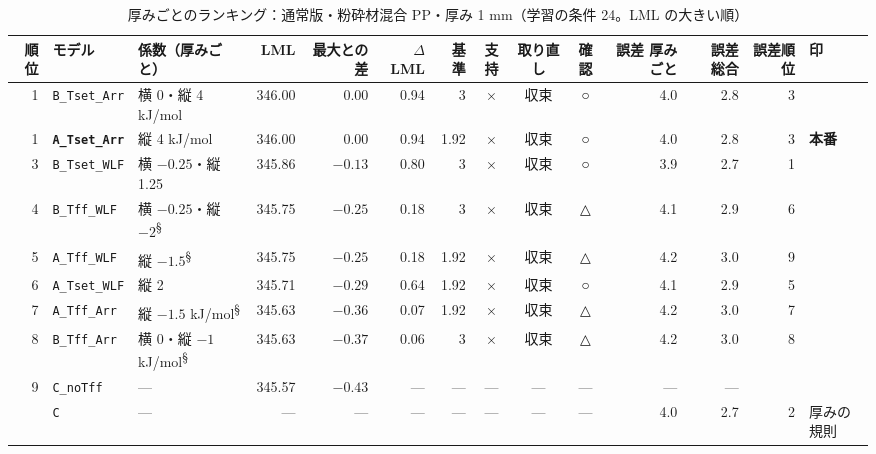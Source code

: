 \documentclass[paper=a4paper,landscape,fontsize=10pt,line_length=62zw,number_of_lines=34]{jlreq}
\let\origtextbf\textbf
\renewcommand{\textbf}[1]{\origtextbf{\gtfamily #1}}   %
\begin{document}
\begin{table}[H]\centering\footnotesize
\caption{厚みごとのランキング：通常版・粉砕材混合 PP・厚み 1 mm（学習の条件 24。LML の大きい順）}
\begin{tabular}{rlp{11\zw}rrrrccc rrrl}
\toprule
順位 & モデル & 係数（厚みごと） & LML & 最大との差 & $\Delta$LML & 基準 & 支持 & 取り直し & 確認 & 誤差 厚みごと & 誤差 総合 & 誤差順位 & 印 \\
\midrule
1 & \texttt{B\_\allowbreak{}Tset\_\allowbreak{}Arr} & 横 0・縦 4 kJ/mol & 346.00 & 0.00 & 0.94 & 3 & × & 収束 & ○ & 4.0 & 2.8 & 3 &  \\
1 & \textbf{\texttt{A\_\allowbreak{}Tset\_\allowbreak{}Arr}} & 縦 4 kJ/mol & 346.00 & 0.00 & 0.94 & 1.92 & × & 収束 & ○ & 4.0 & 2.8 & 3 & \textbf{本番} \\
3 & \texttt{B\_\allowbreak{}Tset\_\allowbreak{}WLF} & 横 $-0.25$・縦 1.25 & 345.86 & $-0.13$ & 0.80 & 3 & × & 収束 & ○ & 3.9 & 2.7 & 1 &  \\
4 & \texttt{B\_\allowbreak{}Tff\_\allowbreak{}WLF} & 横 $-0.25$・縦 $-2$\textsuperscript{§} & 345.75 & $-0.25$ & 0.18 & 3 & × & 収束 & △ & 4.1 & 2.9 & 6 &  \\
5 & \texttt{A\_\allowbreak{}Tff\_\allowbreak{}WLF} & 縦 $-1.5$\textsuperscript{§} & 345.75 & $-0.25$ & 0.18 & 1.92 & × & 収束 & △ & 4.2 & 3.0 & 9 &  \\
6 & \texttt{A\_\allowbreak{}Tset\_\allowbreak{}WLF} & 縦 2 & 345.71 & $-0.29$ & 0.64 & 1.92 & × & 収束 & ○ & 4.1 & 2.9 & 5 &  \\
7 & \texttt{A\_\allowbreak{}Tff\_\allowbreak{}Arr} & 縦 $-1.5$ kJ/mol\textsuperscript{§} & 345.63 & $-0.36$ & 0.07 & 1.92 & × & 収束 & △ & 4.2 & 3.0 & 7 &  \\
8 & \texttt{B\_\allowbreak{}Tff\_\allowbreak{}Arr} & 横 0・縦 $-1$ kJ/mol\textsuperscript{§} & 345.63 & $-0.37$ & 0.06 & 3 & × & 収束 & △ & 4.2 & 3.0 & 8 &  \\
9 & \texttt{C\_\allowbreak{}noTff} & --- & 345.57 & $-0.43$ & --- & --- & --- & --- & --- & --- & --- &  &  \\
 & \texttt{C} & --- & --- & --- & --- & --- & --- & --- & --- & 4.0 & 2.7 & 2 & 厚みの規則 \\
\bottomrule
\end{tabular}
\end{table}
\end{document}
